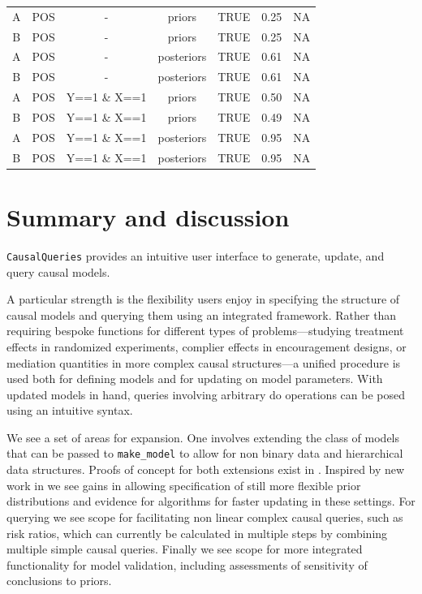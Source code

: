 \documentclass[
  11pt,
  article]{jss}
\begin{document}
\begin{longtable}[t]{ccccccc}
A & POS & - & priors & TRUE & 0.25 & NA\\
\addlinespace
B & POS & - & priors & TRUE & 0.25 & NA\\
A & POS & - & posteriors & TRUE & 0.61 & NA\\
B & POS & - & posteriors & TRUE & 0.61 & NA\\
A & POS & Y==1 \& X==1 & priors & TRUE & 0.50 & NA\\
B & POS & Y==1 \& X==1 & priors & TRUE & 0.49 & NA\\
\addlinespace
A & POS & Y==1 \& X==1 & posteriors & TRUE & 0.95 & NA\\
B & POS & Y==1 \& X==1 & posteriors & TRUE & 0.95 & NA\\
\bottomrule

\end{longtable}

\section{Summary and discussion}\label{summary-and-discussion}

\texttt{CausalQueries} provides an intuitive user interface to generate,
update, and query causal models.

A particular strength is the flexibility users enjoy in specifying the
structure of causal models and querying them using an integrated
framework. Rather than requiring bespoke functions for different types
of problems---studying treatment effects in randomized experiments,
complier effects in encouragement designs, or mediation quantities in
more complex causal structures---a unified procedure is used both for
defining models and for updating on model parameters. With updated
models in hand, queries involving arbitrary do operations can be posed
using an intuitive syntax.

We see a set of areas for expansion. One involves extending the class of
models that can be passed to \texttt{make\_model} to allow for non
binary data and hierarchical data structures. Proofs of concept for both
extensions exist in \citet{humphreys_integrated_2023}. Inspired by new
work in \citet{irons2023causally} we see gains in allowing specification
of still more flexible prior distributions and evidence for algorithms
for faster updating in these settings. For querying we see scope for
facilitating non linear complex causal queries, such as risk ratios,
which can currently be calculated in multiple steps by combining
multiple simple causal queries. Finally we see scope for more integrated
functionality for model validation, including assessments of sensitivity
of conclusions to priors.
\end{document}
